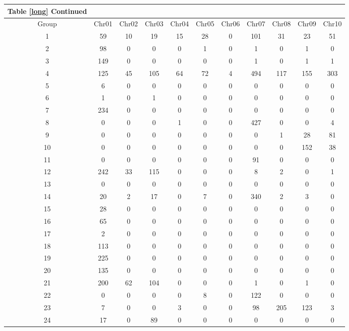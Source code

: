 {\begin{longtable}[c]{|c|c|c|c|c|c|c|c|c|c|c|}
\hline
\multicolumn{1}{|c|}{Table \ref{long} Continued}\\
\hline
Group & Chr01 & Chr02 & Chr03 & Chr04 & Chr05 & Chr06 & Chr07 & Chr08 & Chr09 & Chr10\\ 
\hline
 \endhead %

 \hline
 \endhead
 
 \hline
 \endfoot
 
 \hline
 \endlastfoot
 
1 & 59 & 10 & 19 & 15 & 28 & 0 & 101 & 31 & 23 & 51\\
2 & 98 & 0 & 0 & 0 & 1 & 0 & 1 & 0 & 1 & 0\\
3 & 149 & 0 & 0 & 0 & 0 & 0 & 1 & 0 & 1 & 1\\
4 & 125 & 45 & 105 & 64 & 72 & 4 & 494 & 117 & 155 & 303\\
5 & 6 & 0 & 0 & 0 & 0 & 0 & 0 & 0 & 0 & 0\\
6 & 1 & 0 & 1 & 0 & 0 & 0 & 0 & 0 & 0 & 0\\
7 & 234 & 0 & 0 & 0 & 0 & 0 & 0 & 0 & 0 & 0\\
8 & 0 & 0 & 0 & 1 & 0 & 0 & 427 & 0 & 0 & 4\\
9 & 0 & 0 & 0 & 0 & 0 & 0 & 0 & 1 & 28 & 81\\
10 & 0 & 0 & 0 & 0 & 0 & 0 & 0 & 0 & 152 & 38\\
11 & 0 & 0 & 0 & 0 & 0 & 0 & 91 & 0 & 0 & 0\\
12 & 242 & 33 & 115 & 0 & 0 & 0 & 8 & 2 & 0 & 1\\
13 & 0 & 0 & 0 & 0 & 0 & 0 & 0 & 0 & 0 & 0\\
14 & 20 & 2 & 17 & 0 & 7 & 0 & 340 & 2 & 3 & 0\\
15 & 28 & 0 & 0 & 0 & 0 & 0 & 0 & 0 & 0 & 0\\
16 & 65 & 0 & 0 & 0 & 0 & 0 & 0 & 0 & 0 & 0\\
17 & 2 & 0 & 0 & 0 & 0 & 0 & 0 & 0 & 0 & 0\\
18 & 113 & 0 & 0 & 0 & 0 & 0 & 0 & 0 & 0 & 0\\
19 & 225 & 0 & 0 & 0 & 0 & 0 & 0 & 0 & 0 & 0\\
20 & 135 & 0 & 0 & 0 & 0 & 0 & 0 & 0 & 0 & 0\\
21 & 200 & 62 & 104 & 0 & 0 & 0 & 1 & 0 & 1 & 0\\
22 & 0 & 0 & 0 & 0 & 8 & 0 & 122 & 0 & 0 & 0\\
23 & 7 & 0 & 0 & 3 & 0 & 0 & 98 & 205 & 123 & 3\\
24 & 17 & 0 & 89 & 0 & 0 & 0 & 0 & 0 & 0 & 0\\

\end{longtable}}
